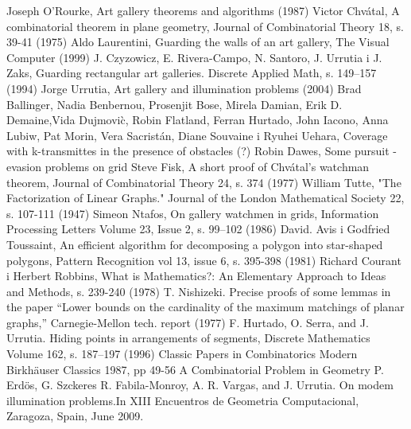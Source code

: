\documentclass[brudnopis]{xmgr}
\theoremstyle{definition}
\begin{document}
\begin{bibdiv}
\begin{biblist}
  Joseph O'Rourke, Art gallery theorems and algorithms (1987)
  Victor Chv\'atal, A combinatorial theorem in plane geometry, Journal of Combinatorial Theory 18, s. 39-41 (1975)
  Aldo Laurentini, Guarding the walls of an art gallery, The Visual Computer (1999)
  J. Czyzowicz, E. Rivera-Campo, N. Santoro, J. Urrutia i J. Zaks, Guarding rectangular art galleries. Discrete Applied Math, s. 149–157 (1994)
  Jorge Urrutia, Art gallery and illumination problems (2004)
  Brad Ballinger, Nadia Benbernou, Prosenjit Bose, Mirela Damian, Erik D. Demaine,Vida Dujmovi\`c, Robin Flatland, Ferran Hurtado, John Iacono, Anna Lubiw, Pat Morin, Vera Sacristán, Diane Souvaine i Ryuhei Uehara, Coverage with k-transmittes in the presence of obstacles (?)
  Robin Dawes, Some pursuit - evasion problems on grid
  Steve Fisk, A short proof of Chv\'atal's watchman theorem, Journal of Combinatorial Theory 24, s. 374 (1977)
  William Tutte, "The Factorization of Linear Graphs." Journal of the London Mathematical Society 22, s. 107-111 (1947)
  Simeon Ntafos, On gallery watchmen in grids, Information Processing Letters Volume 23, Issue 2, s. 99–102 (1986)
  David. Avis i Godfried Toussaint, An efficient algorithm for decomposing a polygon into star-shaped polygons, Pattern Recognition vol 13, issue 6, s. 395-398 (1981)
  Richard Courant i Herbert Robbins, What is Mathematics?: An Elementary Approach to Ideas and Methods, s. 239-240 (1978)
  T. Nishizeki. Precise proofs of some lemmas in the paper “Lower bounds on the cardinality of the maximum matchings of planar graphs,” Carnegie-Mellon tech. report (1977)
   F. Hurtado, O. Serra, and J. Urrutia. Hiding points in arrangements of segments, Discrete Mathematics Volume 162, s. 187–197  (1996)
  Classic Papers in Combinatorics Modern Birkhäuser Classics 1987, pp 49-56 A Combinatorial Problem in Geometry P. Erdös, G. Szckeres
  R. Fabila-Monroy, A. R. Vargas, and J. Urrutia. On modem illumination problems.In XIII Encuentros de Geometria Computacional, Zaragoza, Spain, June 2009.
\end{biblist}
\end{bibdiv}

\listoffigures

\oswiadczenie
\end{document}
